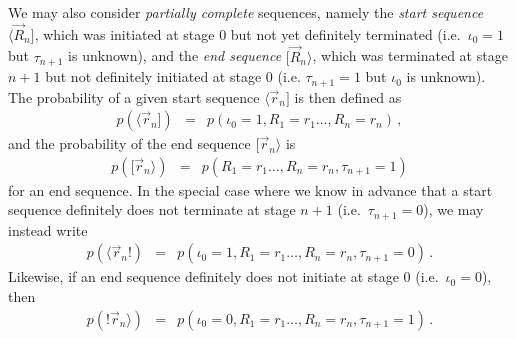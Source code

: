\documentclass[a4paper]{article}
\begin{document}
We may also consider {\em partially complete} sequences, namely
the {\em start sequence}
$\langle\vec{R}_n]$, which was initiated at stage 0 but not yet definitely terminated
(i.e.\ $\iota_0=1$ but $\tau_{n+1}$ is unknown),
and the {\em end sequence} $[\vec{R}_n\rangle$, which was terminated at stage $n+1$ but not
definitely initiated at stage 0 (i.e. $\tau_{n+1}=1$ but $\iota_0$ is unknown).
The probability
of a given start sequence $\langle\vec{r}_n]$ is then defined as
\begin{eqnarray}
p(\langle\vec{r}_n]) & = & p(\iota_0=1,R_1=r_1\ldots,R_n=r_n)\,,
\end{eqnarray}
and the probability of the end sequence $[\vec{r}_n\rangle$ is
\begin{eqnarray}
p([\vec{r}_n\rangle)
& = & p(R_1=r_1\ldots,R_n=r_n,\tau_{n+1}=1)
\end{eqnarray}
for an end sequence.
In the special case where we know in advance that a start sequence definitely does not terminate
at stage $n+1$ (i.e.\ $\tau_{n+1}=0$),  we may instead write
\begin{eqnarray}
p(\langle\vec{r}_n!)
& = & p(\iota_0=1,R_1=r_1\ldots,R_n=r_n,\tau_{n+1}=0)\,.
\end{eqnarray}
Likewise, if an end sequence definitely does not initiate at stage
0 (i.e.\ $\iota_0=0$), then
\begin{eqnarray}
p(!\vec{r}_n\rangle)
& = & p(\iota_0=0,R_1=r_1\ldots,R_n=r_n,\tau_{n+1}=1)\,.
\end{eqnarray}
\end{document}
